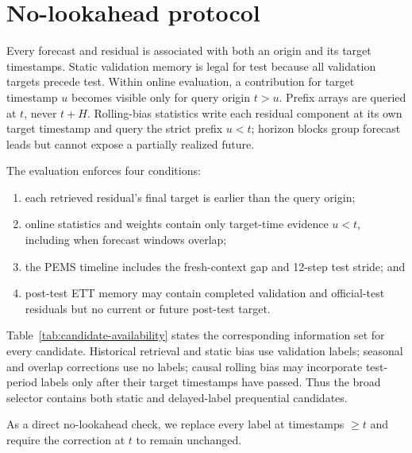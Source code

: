 \section{No-lookahead protocol}
\label{app:causality}

Every forecast and residual is associated with both an origin and its target
timestamps. Static validation memory is legal for test because all validation
targets precede test. Within online evaluation, a contribution for target
timestamp $u$ becomes visible only for query origin $t>u$. Prefix arrays are
queried at $t$, never $t+H$. Rolling-bias statistics write each residual
component at its own target timestamp and query the strict prefix $u<t$;
horizon blocks group forecast leads but cannot expose a partially realized
future.

The evaluation enforces four conditions:
\begin{enumerate}
  \item each retrieved residual's final target is earlier than the query
  origin;
  \item online statistics and weights contain only target-time evidence
  $u<t$, including when forecast windows overlap;
  \item the PEMS timeline includes the fresh-context gap and 12-step test
  stride; and
  \item post-test ETT memory may contain completed validation and
  official-test residuals but no current or future post-test target.
\end{enumerate}

Table~\ref{tab:candidate-availability} states the corresponding information
set for every candidate. Historical retrieval and static bias use validation
labels; seasonal and overlap corrections use no labels; causal rolling bias
may incorporate test-period labels only after their target timestamps have
passed. Thus the broad selector contains both static and delayed-label
prequential candidates.

As a direct no-lookahead check, we replace every label at timestamps
$\ge t$ and require the correction at $t$ to remain unchanged.
